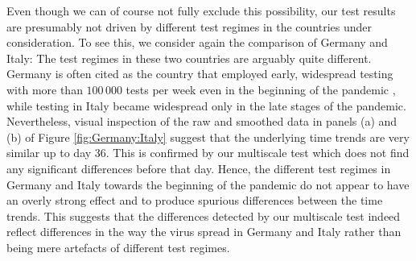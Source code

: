 \documentclass[a4paper,12pt]{article}
\numberwithin{equation}{section}
\begin{document}
Even though we can of course not fully exclude this possibility, our test results are presumably not driven by different test regimes in the countries under consideration. To see this, we consider again the comparison of Germany and Italy: The test regimes in these two countries are arguably quite different. Germany is often cited as the country that employed early, widespread testing with more than $100\,000$ tests per week even in the beginning of the pandemic \citep{Cohen2020}, while testing in Italy became widespread only in the late stages of the pandemic. 
Nevertheless, visual inspection of the raw and smoothed data in panels (a) and (b) of Figure \ref{fig:Germany:Italy} suggest that the underlying time trends are very similar up to day $36$. This is confirmed by our multiscale test which does not find any significant differences before that day. Hence, the different test regimes in Germany and Italy towards the beginning of the pandemic do not appear to have an overly strong effect and to produce spurious differences between the time trends. This suggests that the differences detected by our multiscale test indeed reflect differences in the way the virus spread in Germany and Italy rather than being mere artefacts of different test regimes. 
\end{document}
